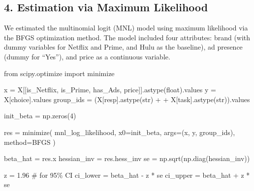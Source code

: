 \documentclass[
  letterpaper,
  DIV=11,
  numbers=noendperiod]{scrartcl}
\newenvironment{Shaded}{\begin{snugshade}}{\end{snugshade}}
\newcommand{\BuiltInTok}[1]{\textcolor[rgb]{0.00,0.23,0.31}{#1}}
\newcommand{\CommentTok}[1]{\textcolor[rgb]{0.37,0.37,0.37}{#1}}
\newcommand{\DecValTok}[1]{\textcolor[rgb]{0.68,0.00,0.00}{#1}}
\newcommand{\FloatTok}[1]{\textcolor[rgb]{0.68,0.00,0.00}{#1}}
\newcommand{\ImportTok}[1]{\textcolor[rgb]{0.00,0.46,0.62}{#1}}
\newcommand{\NormalTok}[1]{\textcolor[rgb]{0.00,0.23,0.31}{#1}}
\newcommand{\OperatorTok}[1]{\textcolor[rgb]{0.37,0.37,0.37}{#1}}
\newcommand{\StringTok}[1]{\textcolor[rgb]{0.13,0.47,0.30}{#1}}
\begin{document}
\subsection{4. Estimation via Maximum
Likelihood}\label{estimation-via-maximum-likelihood}

We estimated the multinomial logit (MNL) model using maximum likelihood
via the BFGS optimization method. The model included four attributes:
brand (with dummy variables for Netflix and Prime, and Hulu as the
baseline), ad presence (dummy for ``Yes''), and price as a continuous
variable.

\begin{Shaded}
\begin{Highlighting}[]
\ImportTok{from}\NormalTok{ scipy.optimize }\ImportTok{import}\NormalTok{ minimize}

\NormalTok{x }\OperatorTok{=}\NormalTok{ X[[}\StringTok{\textquotesingle{}is\_Netflix\textquotesingle{}}\NormalTok{, }\StringTok{\textquotesingle{}is\_Prime\textquotesingle{}}\NormalTok{, }\StringTok{\textquotesingle{}has\_Ads\textquotesingle{}}\NormalTok{, }\StringTok{\textquotesingle{}price\textquotesingle{}}\NormalTok{]].astype(}\BuiltInTok{float}\NormalTok{).values}
\NormalTok{y }\OperatorTok{=}\NormalTok{ X[}\StringTok{\textquotesingle{}choice\textquotesingle{}}\NormalTok{].values}
\NormalTok{group\_ids }\OperatorTok{=}\NormalTok{ (X[}\StringTok{\textquotesingle{}resp\textquotesingle{}}\NormalTok{].astype(}\BuiltInTok{str}\NormalTok{) }\OperatorTok{+} \StringTok{\textquotesingle{}{-}\textquotesingle{}} \OperatorTok{+}\NormalTok{ X[}\StringTok{\textquotesingle{}task\textquotesingle{}}\NormalTok{].astype(}\BuiltInTok{str}\NormalTok{)).values}


\NormalTok{init\_beta }\OperatorTok{=}\NormalTok{ np.zeros(}\DecValTok{4}\NormalTok{)}

\NormalTok{res }\OperatorTok{=}\NormalTok{ minimize(}
\NormalTok{    mnl\_log\_likelihood, }
\NormalTok{    x0}\OperatorTok{=}\NormalTok{init\_beta,}
\NormalTok{    args}\OperatorTok{=}\NormalTok{(x, y, group\_ids),}
\NormalTok{    method}\OperatorTok{=}\StringTok{\textquotesingle{}BFGS\textquotesingle{}}
\NormalTok{)}

\NormalTok{beta\_hat }\OperatorTok{=}\NormalTok{ res.x}
\NormalTok{hessian\_inv }\OperatorTok{=}\NormalTok{ res.hess\_inv}
\NormalTok{se }\OperatorTok{=}\NormalTok{ np.sqrt(np.diag(hessian\_inv))}

\NormalTok{z }\OperatorTok{=} \FloatTok{1.96}  \CommentTok{\# for 95\% CI}
\NormalTok{ci\_lower }\OperatorTok{=}\NormalTok{ beta\_hat }\OperatorTok{{-}}\NormalTok{ z }\OperatorTok{*}\NormalTok{ se}
\NormalTok{ci\_upper }\OperatorTok{=}\NormalTok{ beta\_hat }\OperatorTok{+}\NormalTok{ z }\OperatorTok{*}\NormalTok{ se}


\end{Highlighting}
\end{Shaded}
\end{document}
